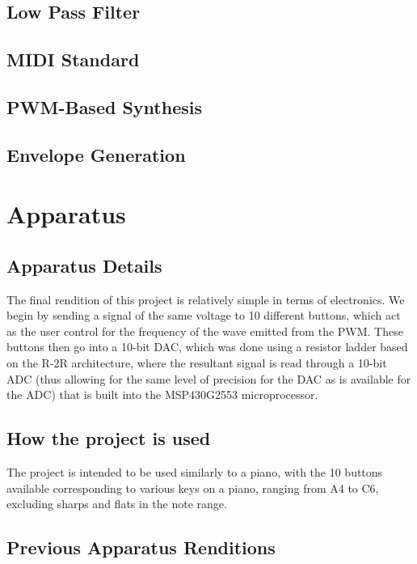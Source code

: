 \documentclass[10pt]{article}
\begin{document}
\subsection{Low Pass Filter}

\subsection{MIDI Standard}

\subsection{PWM-Based Synthesis}

\subsection{Envelope Generation}


\section{Apparatus}

\subsection{Apparatus Details}

The final rendition of this project is relatively simple in terms of electronics. We begin by sending a signal of the same voltage to 10 different buttons, which act as the user control for the frequency of the wave emitted from the PWM. These buttons then go into a 10-bit DAC, which was done using a resistor ladder based on the R-2R architecture, where the resultant signal is read through a 10-bit ADC (thus allowing for the same level of precision for the DAC as is available for the ADC) that is built into the MSP430G2553 microprocessor. %


\subsection{How the project is used}

The project is intended to be used similarly to a piano, with the 10 buttons available corresponding to various keys on a piano, ranging from A4 to C6, excluding sharps and flats in the note range. 

\subsection{Previous Apparatus Renditions}
\end{document}

